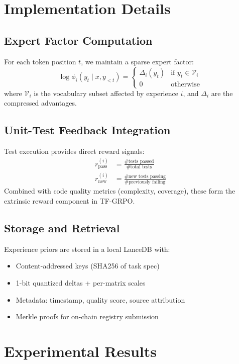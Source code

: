 \documentclass[11pt]{article}
\begin{document}
\section{Implementation Details}
\subsection{Expert Factor Computation}
For each token position \(t\), we maintain a sparse expert factor:
\begin{equation}
\log \phi_i(y_t \mid x, y_{<t}) = \begin{cases}
\Delta_i(y_t) & \text{if } y_t \in \mathcal{V}_i \\
0 & \text{otherwise}
\end{cases}
\end{equation}
where \(\mathcal{V}_i\) is the vocabulary subset affected by experience \(i\), and \(\Delta_i\) are the compressed advantages.

\subsection{Unit-Test Feedback Integration}
Test execution provides direct reward signals:
\begin{align}
r_{\text{pass}}^{(i)} &= \frac{\text{\# tests passed}}{\text{\# total tests}} \\
r_{\text{new}}^{(i)} &= \frac{\text{\# new tests passing}}{\text{\# previously failing}}
\end{align}
Combined with code quality metrics (complexity, coverage), these form the extrinsic reward component in TF-GRPO.

\subsection{Storage and Retrieval}
Experience priors are stored in a local LanceDB with:
\begin{itemize}[leftmargin=1.1em]
  \item Content-addressed keys (SHA256 of task spec)
  \item 1-bit quantized deltas + per-matrix scales
  \item Metadata: timestamp, quality score, source attribution
  \item Merkle proofs for on-chain registry submission
\end{itemize}

\section{Experimental Results}
\end{document}
